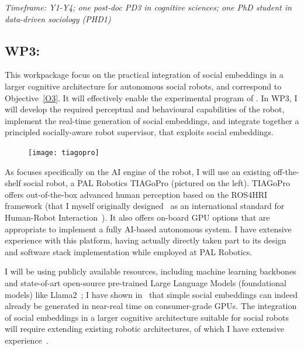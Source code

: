 \vspace{1em}
\noindent\emph{Timeframe: Y1-Y4; one post-doc PD3 in cognitive sciences; one PhD student in data-driven sociology (PHD1)}

\subsection{WP3: \textbf{\WPC}}

This workpackage focus on the practical integration of social embeddings in a
larger cognitive architecture for autonomous social robots, and correspond to
Objective~\ref{O3}. It will effectively enable the experimental program of
\project.  In WP3, I will develop the required perceptual and behavioural
capabilities of the robot, implement the real-time generation of social
embeddings, and integrate together a principled socially-aware robot supervisor,
that exploits social embeddings.

\begin{figure}
    \centering
    \vspace{-10pt}
    \texttt{[image: tiagopro]}
    \label{fig:tiagopro}
\end{figure}

As \project focuses specifically on the AI engine of the robot, I will use an
existing off-the-shelf social robot, a PAL Robotics TIAGoPro
(pictured on the left). TIAGoPro offers out-of-the-box advanced human perception
based on the ROS4HRI framework (that I myself originally
designed~\cite{mohamed2021ros4hri} as an international standard for Human-Robot
Interaction~\cite{lemaignan2022ros}). It also offers on-board GPU options that
are appropriate to implement a fully AI-based autonomous system. I have
extensive experience with this platform, having actually directly taken part to
its design and software stack implementation while employed at PAL Robotics.

I will be using publicly available resources, including machine
learning backbones and state-of-art open-source
pre-trained Large Language Models (foundational models) like
Llama2~\cite{touvron2023llama}; I have shown in~\cite{lemaignan2024social} that
simple social embeddings can indeed already be generated in near-real time on
consumer-grade GPUs. The integration of social embeddings in a larger cognitive
architecture suitable for social robots will require extending existing
robotic architectures, of which I have extensive
experience~\cite{lemaignan2017artificial, lemaignan2015pyrobots,lemaignan2011what}.

